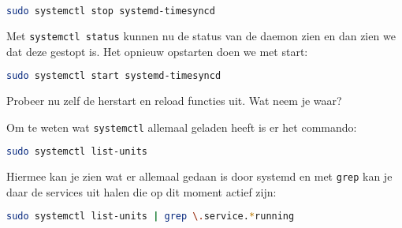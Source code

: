 \begin{lstlisting}[language=bash]
sudo systemctl stop systemd-timesyncd
\end{lstlisting}

Met \texttt{systemctl status} kunnen nu de status van de daemon zien en dan zien we dat deze gestopt is. Het opnieuw opstarten doen we met start:

\begin{lstlisting}[language=bash]
sudo systemctl start systemd-timesyncd
\end{lstlisting}

Probeer nu zelf de herstart en reload functies uit. Wat neem je waar?

Om te weten wat \texttt{systemctl} allemaal geladen heeft is er het commando:
\begin{lstlisting}[language=bash]
sudo systemctl list-units
\end{lstlisting}
Hiermee kan je zien wat er allemaal gedaan is door systemd en met \texttt{grep} kan je daar de services uit halen die op dit moment actief zijn:
\begin{lstlisting}[language=bash]
sudo systemctl list-units | grep \.service.*running
\end{lstlisting}

